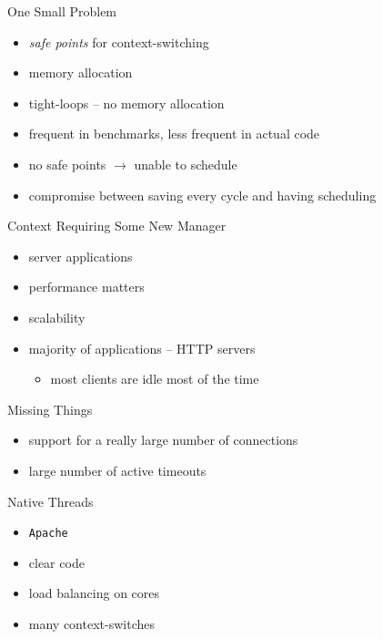 \documentclass{beamer}
\begin{document}
\begin{frame}{One Small Problem}
  \begin{itemize}[<+->]
    \item \textit{safe points} for context-switching
    \item memory allocation
    \item tight-loops -- no memory allocation
    \item frequent in benchmarks, less frequent in actual code
    \item no safe points $\rightarrow$ unable to schedule
    \item compromise between saving every cycle and having scheduling
  \end{itemize}
\end{frame}

\begin{frame}{Context Requiring Some New Manager}
  \begin{itemize}
    \item server applications
    \pause
    \item performance matters
    \item scalability
    \pause
    \item majority of applications -- HTTP servers
    \begin{itemize}
      \item most clients are idle most of the time
    \end{itemize}
  \end{itemize}
\end{frame}

\begin{frame}{Missing Things}
  \begin{itemize}
    \item support for a really large number of connections
    \item large number of active timeouts
  \end{itemize}
\end{frame}

\begin{frame}{Native Threads}
  \begin{center}\end{center}
  \begin{itemize}
    \item \texttt{Apache}
    \pause
    \item clear code
    \item load balancing on cores
    \pause
    \item many context-switches
  \end{itemize}
\end{frame}
\end{document}

